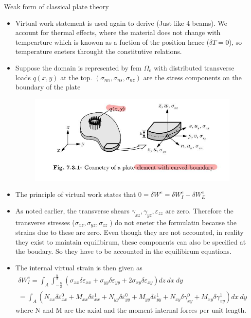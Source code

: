 	\begin{frame}{Weak form of classical plate theory}
		\begin{itemize}
			\item Virtual work statement is used again to derive (Just like 4 beams). We account for thermal effects, where the material does not change with tempearture which is knowon as a fuction of the position  hence ($\delta T = 0$), so temperature eneters throught the constitutive relations.
			\item Suppose the domain is represented by fem $\Omega_e$ with  distributed transverse loads $q(x,y)$ at the top. $(\sigma_{nn},\sigma_{ns},\sigma_{nz})$ are the stress components on the boundary of the plate
			\begin{figure}
				\centering
				\includegraphics[width=0.8 \linewidth]{Figure/fig31} 		
			\end{figure}
		\end{itemize}
	\end{frame}


	\begin{frame}
		\begin{itemize}
			\item The principle of virtual work states that $0 = \delta W^e = \delta W_I^e + \delta W_E^e$
			\item As noted earlier, the transverse shears $\gamma_{xz},\gamma_{yz},\varepsilon_{zz}$ are zero. Therefore the transverse stresses ($\sigma_{xz},\sigma_{yz},\sigma_{zz}$ ) do not eneter the formulatin because the strains due to these are zero. Even though they are not accounted, in reality they exist to maintain equilibirum, these components can also be specified at the boudary. So they have to be accounted in the equilibirum equations. 
			\item The internal virtual strain is then given as 
			\begin{equation}
				\begin{aligned}
					\delta W_I^e = \int_A \int_{-\frac{h}{2}}^{\frac{h}{2}} 
					\left(
					\sigma_{xx} \delta \varepsilon_{xx} + \sigma_{yy} \delta \varepsilon_{yy} + 2\sigma_{xy} \delta \varepsilon_{xy}
					\right) dz~dx~dy\\
					= \int_A \left(N_{xx}\delta \varepsilon_{xx}^0 + M_{xx}\delta\varepsilon_{xx}^1 + N_{yy}\delta\varepsilon_{yy}^0 + M_{yy}\delta\varepsilon_{yy}^1 
					 + N_{xy}\delta\gamma_{xy}^0 + M_{xy}\delta\gamma_{xy}^1 \right) dx~dy
				\end{aligned}
			\end{equation}
			where N and M are the axial and the moment internal forces per unit length. 
		\end{itemize}
	\end{frame}


